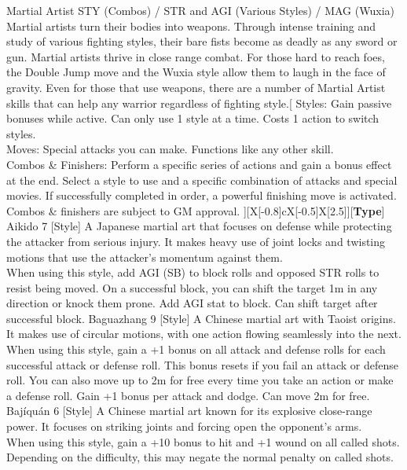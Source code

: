 ﻿\begin{path}
{Martial Artist}
{STY (Combos) / STR and AGI (Various Styles) / MAG (Wuxia)}
{Martial artists turn their bodies into weapons. Through intense training and study of various fighting styles, their bare fists become as deadly as any sword or gun.}
{Martial artists thrive in close range combat. For those hard to reach foes, the Double Jump move and the Wuxia style allow them to laugh in the face of gravity. Even for those that use weapons, there are a number of Martial Artist skills that can help any warrior regardless of fighting style.}[
Styles: Gain passive bonuses while active. Can only use 1 style at a time. Costs 1 action to switch styles.
\\Moves: Special attacks you can make. Functions like any other skill.
\\Combos \& Finishers: Perform a specific series of actions and gain a bonus effect at the end. Select a style to use and a specific combination of attacks and special movies. If successfully completed in order, a powerful finishing move is activated. Combos \& finishers are subject to GM approval.
][X[-0.8]cX[-0.5]X[2.5]][\textbf{Type}]
\skilldescription
{Aikido}
{7}
[Style]
{A Japanese martial art that focuses on defense while protecting the attacker from serious injury. It makes heavy use of joint locks and twisting motions that use the attacker's momentum against them.
\\When using this style, add AGI (SB) to block rolls and opposed STR rolls to resist being moved. On a successful block, you can shift the target 1m in any direction or knock them prone.}
{Add AGI stat to block. Can shift target after successful block.}
\skilldescription
{Baguazhang}
{9}
[Style]
{A Chinese martial art with Taoist origins. It makes use of circular motions, with one action flowing seamlessly into the next.
\\When using this style, gain a +1 bonus on all attack and defense rolls for each successful attack or defense roll. This bonus resets if you fail an attack or defense roll. You can also move up to 2m for free every time you take an action or make a defense roll.}
{Gain +1 bonus per attack  and dodge. Can move 2m for free.}
\skilldescription
{Bajíquán}
{6}
[Style]
{A Chinese martial art known for its explosive close-range power. It focuses on striking joints and forcing open the opponent's arms.
\\When using this style, gain a +10 bonus to hit and +1 wound on all called shots. Depending on the difficulty, this may negate the normal penalty on called shots.
}
\end{path}
